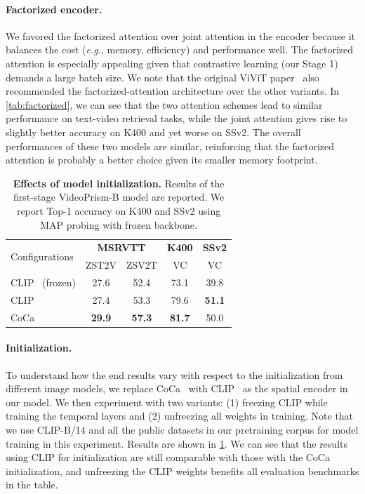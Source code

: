 \documentclass{article}
\theoremstyle{plain}
\theoremstyle{definition}
\theoremstyle{remark}
\newcommand{\OURS}{VideoPrism\xspace}
\newcommand{\eg}{\textit{e.g.}\xspace}
\begin{document}
\paragraph{Factorized encoder.} We favored the factorized attention over joint attention in the encoder because it balances the cost (\eg, memory, efficiency) and performance well. The factorized attention is especially appealing given that contrastive learning (our Stage 1) demands a large batch size. We note that the original ViViT paper~\cite{arnab2021vivit} also recommended the factorized-attention architecture over the other variants. In \cref{tab:factorized}, we can see that the two attention schemes lead to similar performance on text-video retrieval tasks, while the joint attention gives rise to slightly better accuracy on K400 and yet worse on SSv2. The overall performances of these two models are similar, reinforcing that the factorized attention is probably a better choice given its smaller memory footprint.

\begin{table}[t]
    \caption{\textbf{Effects of model initialization.} Results of the first-stage \OURS-B model are reported. We report Top-1 accuracy on K400 and SSv2 using MAP probing with frozen backbone.}
	\label{tab:initialization}
	\vskip 0.1in
	\begin{center}
\begin{scriptsize}
		\begin{tabular}	{lcccc}
			\toprule
			\multirow{2}{*}{Configurations} & \multicolumn{2}{c}{\textbf{MSRVTT}} & \textbf{K400} & \textbf{SSv2} \\
			& ZST2V & ZSV2T & VC & VC \\
			\midrule
	CLIP~\cite{radford2021learning} (frozen) & 27.6 & 52.4 & 73.1 & 39.8 \\
	CLIP~\cite{radford2021learning} & 27.4 & 53.3 & 79.6 & \textbf{51.1} \\
    CoCa~\cite{yu2022coca} & \textbf{29.9} & \textbf{57.3} & \textbf{81.7} & 50.0 \\
		\bottomrule
		\end{tabular}
	\end{scriptsize}
	\end{center}
	\vskip -0.1in
\end{table}

\paragraph{Initialization.} To understand how the end results vary with respect to the initialization from different image models, we replace CoCa~\cite{yu2022coca} with CLIP~\cite{radford2021learning} as the spatial encoder in our model. We then experiment with two variants: (1) freezing CLIP while training the temporal layers and (2) unfreezing all weights in training. Note that we use CLIP-B/14 and all the public datasets in our pretraining corpus for model training in this experiment. Results are shown in \cref{tab:initialization}. We can see that the results using CLIP for initialization are still comparable with those with the CoCa initialization, and unfreezing the CLIP weights benefits all evaluation benchmarks in the table.
\end{document}
